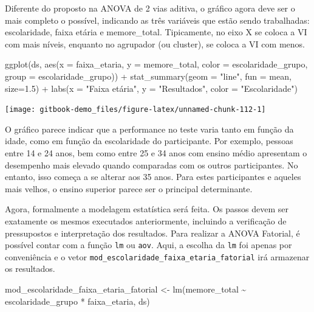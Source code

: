 \documentclass[
]{book}
\newenvironment{Shaded}{\begin{snugshade}}{\end{snugshade}}
\newcommand{\AttributeTok}[1]{\textcolor[rgb]{0.77,0.63,0.00}{#1}}
\newcommand{\FloatTok}[1]{\textcolor[rgb]{0.00,0.00,0.81}{#1}}
\newcommand{\FunctionTok}[1]{\textcolor[rgb]{0.00,0.00,0.00}{#1}}
\newcommand{\NormalTok}[1]{#1}
\newcommand{\OtherTok}[1]{\textcolor[rgb]{0.56,0.35,0.01}{#1}}
\newcommand{\SpecialCharTok}[1]{\textcolor[rgb]{0.00,0.00,0.00}{#1}}
\newcommand{\StringTok}[1]{\textcolor[rgb]{0.31,0.60,0.02}{#1}}
\begin{document}
Diferente do proposto na ANOVA de 2 vias aditiva, o gráfico agora deve ser o mais completo o possível, indicando as três variáveis que estão sendo trabalhadas: escolaridade, faixa etária e memore\_total. Tipicamente, no eixo X se coloca a VI com mais níveis, enquanto no agrupador (ou cluster), se coloca a VI com menos.

\begin{Shaded}
\begin{Highlighting}[]
\FunctionTok{ggplot}\NormalTok{(ds, }\FunctionTok{aes}\NormalTok{(}\AttributeTok{x =}\NormalTok{ faixa\_etaria, }\AttributeTok{y =}\NormalTok{ memore\_total, }
               \AttributeTok{color =}\NormalTok{ escolaridade\_grupo, }
               \AttributeTok{group =}\NormalTok{ escolaridade\_grupo)) }\SpecialCharTok{+}
  \FunctionTok{stat\_summary}\NormalTok{(}\AttributeTok{geom =} \StringTok{"line"}\NormalTok{, }\AttributeTok{fun =}\NormalTok{ mean, }\AttributeTok{size=}\FloatTok{1.5}\NormalTok{) }\SpecialCharTok{+}
  \FunctionTok{labs}\NormalTok{(}\AttributeTok{x =} \StringTok{"Faixa etária"}\NormalTok{, }\AttributeTok{y =} \StringTok{"Resultados"}\NormalTok{, }
       \AttributeTok{color =} \StringTok{"Escolaridade"}\NormalTok{)}
\end{Highlighting}
\end{Shaded}

\begin{center}\texttt{[image: gitbook-demo\_files/figure-latex/unnamed-chunk-112-1]} \end{center}

O gráfico parece indicar que a performance no teste varia tanto em função da idade, como em função da escolaridade do participante. Por exemplo, pessoas entre 14 e 24 anos, bem como entre 25 e 34 anos com ensino médio apresentam o desempenho mais elevado quando comparadas com os outros participantes. No entanto, isso começa a se alterar aos 35 anos. Para estes participantes e aqueles mais velhos, o ensino superior parece ser o principal determinante.

Agora, formalmente a modelagem estatística será feita. Os passos devem ser exatamente os mesmos executados anteriormente, incluindo a verificação de pressupostos e interpretação dos resultados. Para realizar a ANOVA Fatorial, é possível contar com a função \texttt{lm} ou \texttt{aov}. Aqui, a escolha da \texttt{lm} foi apenas por conveniência e o vetor \texttt{mod\_escolaridade\_faixa\_etaria\_fatorial} irá armazenar os resultados.

\begin{Shaded}
\begin{Highlighting}[]
\NormalTok{mod\_escolaridade\_faixa\_etaria\_fatorial }\OtherTok{\textless{}{-}} \FunctionTok{lm}\NormalTok{(memore\_total }\SpecialCharTok{\textasciitilde{}} 
\NormalTok{                                               escolaridade\_grupo }\SpecialCharTok{*} 
\NormalTok{                                               faixa\_etaria, ds)}
\end{Highlighting}
\end{Shaded}
\end{document}
